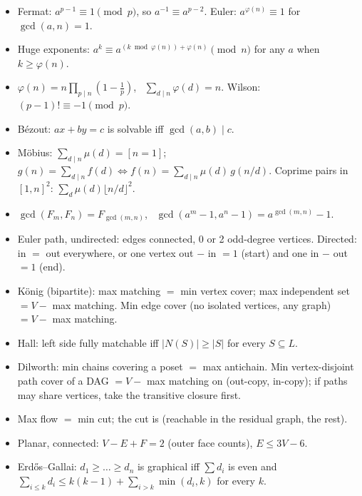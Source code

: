 {
\begin{itemize}
  \item Fermat: $a^{p-1} \equiv 1 \pmod p$, so $a^{-1} \equiv a^{p-2}$.
        Euler: $a^{\varphi(n)} \equiv 1$ for $\gcd(a, n) = 1$.
  \item Huge exponents: $a^k \equiv a^{(k \bmod \varphi(n)) + \varphi(n)} \pmod n$ for any $a$
        when $k \ge \varphi(n)$.
  \item $\varphi(n) = n\prod_{p \mid n}(1 - \frac1p)$, \ $\sum_{d \mid n} \varphi(d) = n$.
        Wilson: $(p-1)! \equiv -1 \pmod p$.
  \item Bézout: $ax + by = c$ is solvable iff $\gcd(a, b) \mid c$.
  \item M\"obius: $\sum_{d \mid n} \mu(d) = [n = 1]$; \
        $g(n) = \sum_{d \mid n} f(d) \iff f(n) = \sum_{d \mid n} \mu(d)\, g(n/d)$.
        Coprime pairs in $[1,n]^2$: $\sum_d \mu(d) \lfloor n/d \rfloor^2$.
  \item $\gcd(F_m, F_n) = F_{\gcd(m,n)}$, \ $\gcd(a^m - 1, a^n - 1) = a^{\gcd(m,n)} - 1$.
\end{itemize}

\begin{itemize}
  \item Euler path, undirected: edges connected, 0 or 2 odd-degree vertices.
        Directed: in $=$ out everywhere, or one vertex out $-$ in $= 1$ (start)
        and one in $-$ out $= 1$ (end).
  \item K\"onig (bipartite): max matching $=$ min vertex cover;
        max independent set $= V -$ max matching.
        Min edge cover (no isolated vertices, any graph) $= V -$ max matching.
  \item Hall: left side fully matchable iff $|N(S)| \ge |S|$ for every $S \subseteq L$.
  \item Dilworth: min chains covering a poset $=$ max antichain.
        Min vertex-disjoint path cover of a DAG $= V -$ max matching on (out-copy, in-copy);
        if paths may share vertices, take the transitive closure first.
  \item Max flow $=$ min cut; the cut is (reachable in the residual graph, the rest).
  \item Planar, connected: $V - E + F = 2$ (outer face counts), $E \le 3V - 6$.
  \item Erdős–Gallai: $d_1 \ge \dots \ge d_n$ is graphical iff $\sum d_i$ is even and
        $\sum_{i \le k} d_i \le k(k-1) + \sum_{i > k}\min(d_i, k)$ for every $k$.
\end{itemize}

}

